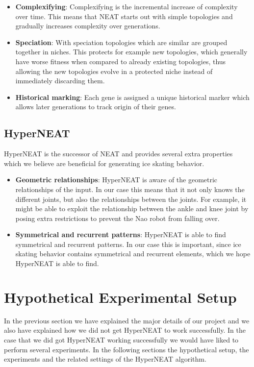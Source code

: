 \documentclass[a4paper,10pt]{article}
\begin{document}
\begin{itemize}
	\item \textbf{Complexifying}: Complexifying is the incremental increase of complexity over time. This means that NEAT starts out with simple topologies and gradually increases complexity over generations.
	\item \textbf{Speciation}: With speciation topologies which are similar are grouped together in niches. This protects for example new topologies, which generally have worse fitness when compared to already existing topologies, thus allowing the new topologies evolve in a protected niche instead of immediately discarding them.
	\item \textbf{Historical marking}: Each gene is assigned a unique historical marker which allows later generations to track origin of their genes.  
\end{itemize}

\subsection{HyperNEAT}
HyperNEAT is the successor of NEAT and provides several extra properties which we believe are beneficial for generating ice skating behavior.

\begin{itemize}
	\item \textbf{Geometric relationships}: HyperNEAT is aware of the geometric relationships of the input. In our case this means that it not only knows the different joints, but also the relationships between the joints. For example, it might be able to exploit the relationship between the ankle and knee joint by posing extra restrictions to prevent the Nao robot from falling over.
	\item \textbf{Symmetrical and recurrent patterns}: HyperNEAT is able to find symmetrical and recurrent patterns. In our case this is important, since ice skating behavior contains symmetrical and recurrent elements, which we hope HyperNEAT is able to find.
\end{itemize}


\section{Hypothetical Experimental Setup}
\label{sec:hypothetical-experimental-setup}
In the previous section we have explained the major details of our project and we also have explained how we did not get HyperNEAT to work successfully. In the case that we did got HyperNEAT working successfully we would have liked to perform several experiments. In the following sections the hypothetical setup, the experiments and the related settings of the HyperNEAT algorithm.
\end{document}
